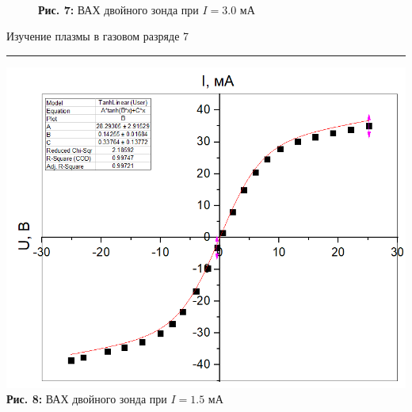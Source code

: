 \documentclass[12pt,a4paper]{scrartcl}
\begin{document}
\begin{figure}[h]
\begin{minipage}{0.5\linewidth}
\begin{center}
\\\textbf{Рис. 7:} ВАХ двойного зонда при $I = 3.0$ мА

\end{center}
\end{minipage}
\end{figure}

\newpage


	\begin{flushleft}
		\footnotesize{Изучение плазмы в газовом разряде} \hspace{\fill} \footnotesize{7}
		\\[-0.3cm]\noindent\rule{\textwidth}{0.3pt}
	\end{flushleft}	

\begin{center}
\includegraphics[scale=0.5]{PIC_8.png}
\\\textbf{Рис. 8:} ВАХ двойного зонда при $I = 1.5$ мА

\end{center}
\end{document}
